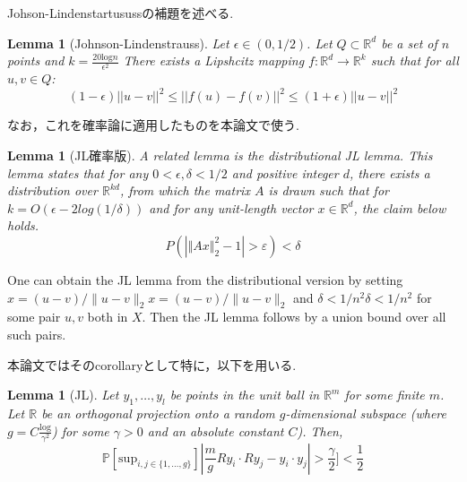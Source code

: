 \documentclass{ujarticle}
\newtheorem{lem}[thm]{Lemma}
\begin{document}
Johson-Lindenstartusussの補題を述べる.

\begin{lem}[Johnson-Lindenstrauss]
  Let $ \epsilon \in (0, 1/2)$. Let $Q ⊂ \mathbb{R}^d$ be a set of $n$ points and $k =\frac{20 \mathrm{log}n}{\epsilon^2}$
  There exists a Lipshcitz mapping $f : \mathbb{R}^d \to \mathbb{R}^k$ such that for all $u, v \in Q$:
  \begin{equation*}
    (1 − \epsilon)||u − v||^2 \le ||f(u) − f(v)||^2 \le (1 + \epsilon )||u − v||^2
\end{equation*}
\end{lem}
なお，これを確率論に適用したものを本論文で使う.
\begin{lem}[JL確率版]
A related lemma is the distributional JL lemma. This lemma states that for any
$0 <\epsilon, \delta<1/2$ and positive integer $d$, there exists a distribution over $\mathbb{R}^{kd}$,
from which the matrix $A$ is drawn such that for $k = O(\epsilon−2log(1/\delta))$ and for any unit-length vector $x  \in \mathbb{R}^d$,
the claim below holds.
\begin{equation*}
  {\displaystyle P(|\Vert Ax\Vert _{2}^{2}-1|>\varepsilon )<\delta }
\end{equation*}
\end{lem}
One can obtain the JL lemma from the distributional version by setting
${\displaystyle x=(u-v)/\|u-v\|_{2}} x=(u-v)/\|u-v\|_{2}$ and ${\displaystyle \delta <1/n^{2}} \delta <1/n^{2}$
for some pair $u,v$ both in $X$.
Then the JL lemma follows by a union bound over all such pairs.

本論文ではそのcorollaryとして特に，以下を用いる.
\begin{lem}[JL]
  Let $y_1,\dots,y_l$ be points in the unit ball in $\mathbb{R}^m$ for some finite $m$.
Let $\mathbb{R}$ be an orthogonal projection onto a random $g$-dimensional subspace
(where $g = C \frac{\mathrm{log}}{\gamma^2}$) for some $\gamma > 0$ and an
absolute constant $C$). Then,
\begin{equation*}
\mathbb{P}[\mathrm{sup}_{i,j \in \{1,\dots,g\}}] | \frac{m}{g}Ry_i\cdot Ry_j -y_i\cdot y_j| > \frac{ \gamma}{2}] < \frac{1}{2}
\end{equation*}
\end{lem}
\end{document}
